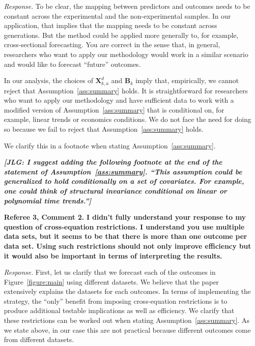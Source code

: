 \noindent \textit{Response.} To be clear, the mapping between predictors and outcomes needs to be constant across the experimental and the non-experimental samples. In our application, that implies that the mapping needs to be constant across generations. But the method could be applied more generally to, for example, cross-sectional forecasting. You are correct in the sense that, in general, researchers who want to apply our methodology would work in a similar scenario and would like to forecast ``future'' outcomes.

In our analysis, the choices of $\bm{X}_{k,a}^d$ and $\bm{B}_k$ imply that, empirically, we cannot reject that Assumption~\ref{ass:summary} holds. It is straightforward for researchers who want to apply our methodology and have sufficient data to work with a modified version of Assumption~\ref{ass:summary} that is conditional on, for example, linear trends or economics conditions. We do not face the need for doing so because we fail to reject that Assumption~\ref{ass:summary} holds. 

We clarify this in a footnote when stating Assumption~\ref{ass:summary}.

\textit{\textbf{[JLG: I suggest adding the following footnote at the end of the statement of Assumption~\ref{ass:summary}. ``This assumption could be generalized to hold conditionally on a set of covariates. For example, one could think of structural invariance conditional on linear or polynomial time trends.'']}}

\noindent \textbf{Referee 3, Comment 2. I didn't fully understand your response to my question of cross-equation restrictions. I understand you use multiple data sets, but it seems to be that there is more than one outcome per data set. Using such restrictions should not only improve efficiency but it would also be important in terms of interpreting the results.} 

\noindent \textit{Response.} First, let us clarify that we forecast each of the outcomes in Figure~\ref{figure:main} using different datasets. We believe that the paper extensively explains the datasets for each outcomes. In terms of implementing the strategy, the ``only'' benefit from imposing cross-equation restrictions is to produce additional testable implications as well as efficiency. We clarify that these restrictions can be worked out when stating Assumption~\ref{ass:summary}. As we state above, in our case this are not practical because different outcomes come from different datasets. 

